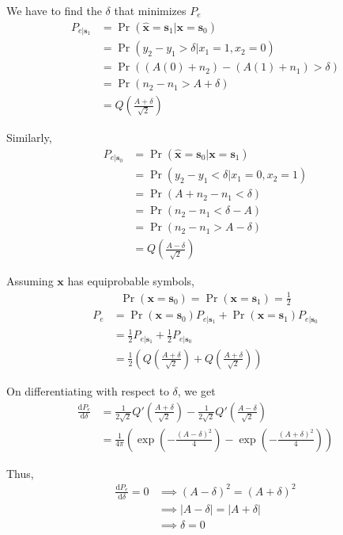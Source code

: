 \documentclass[journal,12pt,twocolumn]{IEEEtran}
\providecommand{\pr}[1]{\ensuremath{\Pr\left(#1\right)}}
\providecommand{\brak}[1]{\ensuremath{\left(#1\right)}}
\providecommand{\der}[1]{\mathrm{d} #1}
\let\vec\mathbf
\numberwithin{equation}{section}
\renewcommand\thesection{\arabic{section}}
\begin{document}
\begin{enumerate}[label=\thesection.\arabic*,ref=\thesection.\theenumi]
	We have to find the $\delta$ that minimizes $P_e$
	\begin{align}
		P_{e|\vec{s}_1} &= \pr{\hat{\vec{x}} = \vec{s}_1|\vec{x} = \vec{s}_0} \\
		&= \pr{y_2 - y_1 > \delta|x_1 = 1, x_2=0} \\
		&= \pr{(A(0)+n_2) - (A(1)+n_1) > \delta } \\
		&= \pr{n_2 - n_1 > A + \delta} \\
		&= Q\brak{\frac{A+\delta}{\sqrt{2}}}
	\end{align}
	
	Similarly,
	\begin{align}
		P_{e|\vec{s}_0} &= \pr{\hat{\vec{x}} = \vec{s}_0|\vec{x} = \vec{s}_1} \\
		&= \pr{y_2 - y_1 < \delta|x_1 = 0, x_2=1} \\
		&= \pr{A + n_2 - n_1 < \delta} \\
		&= \pr{n_2 - n_1 < \delta - A} \\
		&= \pr{n_2 - n_1 > A-\delta} \\
		&= Q\brak{\frac{A-\delta}{\sqrt{2}}}
	\end{align}

	Assuming $\vec{x}$ has equiprobable symbols,
	\begin{align}
		\pr{\vec{x} = \vec{s}_0} = \pr{\vec{x} = \vec{s}_1} = \frac{1}{2}
	\end{align}
	\begin{align}
		P_e &= \pr{\vec{x} = \vec{s}_0} P_{e|\vec{s}_1} + \pr{\vec{x} = \vec{s}_1} P_{e|\vec{s}_0} \\
		&= \frac{1}{2} P_{e|\vec{s}_1} + \frac{1}{2} P_{e|\vec{s}_0} \\
		&= \frac{1}{2} \brak{Q\brak{\frac{A+\delta}{\sqrt{2}}} + Q\brak{\frac{A+\delta}{\sqrt{2}}}}
	\end{align}
	
	On differentiating with respect to $\delta$, we get
	\begin{align}
		\frac{\der{P_e}}{\der{\delta}} &= \frac{1}{2\sqrt{2}} Q'\brak{\frac{A+\delta}{\sqrt{2}}} - \frac{1}{2\sqrt{2}} Q'\brak{\frac{A-\delta}{\sqrt{2}}} \\
		&= \frac{1}{4\pi} \brak{\exp\brak{-\frac{(A-\delta)^2}{4}} - \exp\brak{-\frac{(A+\delta)^2}{4}}}
	\end{align}
	
	Thus,
	\begin{align}
		\frac{\der{P_e}}{\der{\delta}} = 0 &\implies (A-\delta)^2 = (A+\delta)^2 \\
		&\implies |A-\delta| = |A+\delta| \\
		&\implies \delta = 0
	\end{align}
	

\end{enumerate}
\end{document}
